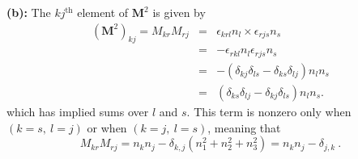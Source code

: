 \textbf{(b):} The $kj^{\text{th}}$ element of $\textbf{M}^2$ is given by
\begin{eqnarray}
(\textbf{M}^2)_{kj} = M_{kr} M_{rj} &=& \epsilon_{krl} n_l \times \epsilon_{rjs} n_s \nonumber \\
&=& -\epsilon_{rkl} n_l \epsilon_{rjs}  n_s \nonumber \\
&=& -(\delta_{kj} \delta_{ls} - \delta_{ks} \delta_{lj}) n_l n_s \nonumber \\
&=& (\delta_{ks} \delta_{lj}-\delta_{kj} \delta_{ls}) n_l n_s.
\end{eqnarray}
which has implied sums over $l$ and $s$. This term is nonzero only when $(k=s,~l=j)$ or when $(k=j,~l=s)$, meaning that 
\begin{equation}
\boxed{M_{kr} M_{rj} = n_k n_j - \delta_{k,j} (n_1^2 + n_2^2 + n_3^2) = n_k n_j - \delta_{j, k}}~.
\end{equation}
